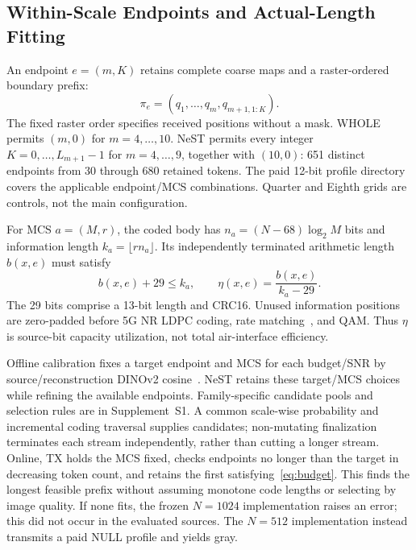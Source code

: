 \subsection{Within-Scale Endpoints and Actual-Length Fitting}
An endpoint $e=(m,K)$ retains complete coarse maps and a raster-ordered boundary prefix:
\begin{equation}
\pi_e=(q_1,\ldots,q_m,q_{m+1,1:K}).
\label{eq:prefix}
\end{equation}
The fixed raster order specifies received positions without a mask. WHOLE permits $(m,0)$ for $m=4,\ldots,10$. NeST permits every integer $K=0,\ldots,L_{m+1}-1$ for $m=4,\ldots,9$, together with $(10,0)$: 651 distinct endpoints from 30 through 680 retained tokens. The paid 12-bit profile directory covers the applicable endpoint/MCS combinations. Quarter and Eighth grids are controls, not the main configuration.

For MCS $a=(M,r)$, the coded body has $n_a=(N-68)\log_2M$ bits and information length $k_a=\lfloor rn_a\rfloor$. Its independently terminated arithmetic length $b(x,e)$ must satisfy
\begin{equation}
b(x,e)+29\leq k_a,\qquad \eta(x,e)=\frac{b(x,e)}{k_a-29}.
\label{eq:budget}
\end{equation}
The 29 bits comprise a 13-bit length and CRC16. Unused information positions are zero-padded before 5G NR LDPC coding, rate matching~\cite{nr}, and QAM. Thus $\eta$ is source-bit capacity utilization, not total air-interface efficiency.

Offline calibration fixes a target endpoint and MCS for each budget/SNR by source/reconstruction DINOv2 cosine~\cite{dinov2}. NeST retains these target/MCS choices while refining the available endpoints. Family-specific candidate pools and selection rules are in Supplement~S1. A common scale-wise probability and incremental coding traversal supplies candidates; non-mutating finalization terminates each stream independently, rather than cutting a longer stream. Online, TX holds the MCS fixed, checks endpoints no longer than the target in decreasing token count, and retains the first satisfying~\eqref{eq:budget}. This finds the longest feasible prefix without assuming monotone code lengths or selecting by image quality. If none fits, the frozen $N=1024$ implementation raises an error; this did not occur in the evaluated sources. The $N=512$ implementation instead transmits a paid NULL profile and yields gray.

\ifCLASSOPTIONonecolumn\else\fi
